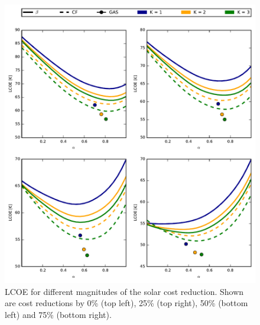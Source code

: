 \documentclass[a4paper, 5p, sort&compress]{elsarticle}%
\begin{document}
\begin{figure}[p]
  \centering
  \includegraphics[width = 2\columnwidth]{solarAnalysis}
  \caption{LCOE for different magnitudes of the solar cost
    reduction. Shown are cost reductions by 0\% (top left), 25\% (top
    right), 50\% (bottom left) and 75\% (bottom right).}
  \label{fig:red-solar}
\end{figure}
\end{document}
